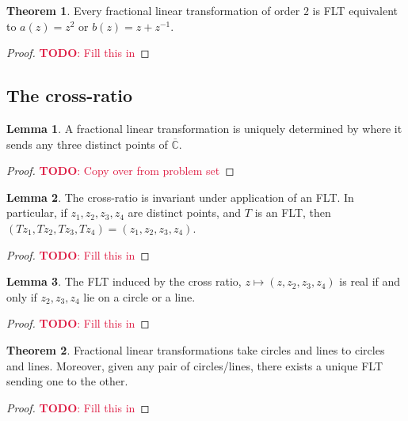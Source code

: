 \documentclass[aps,pra,showpacs,notitlepage,onecolumn,superscriptaddress,nofootinbib]{revtex4-1}
\newcommand{\pop}[1]{\textcolor{crimson}{#1}}
\theoremstyle{definition}
\newtheorem{lemma}{Lemma}[section]
\newtheorem{theorem}{Theorem}[section]
\begin{document}
\begin{theorem}
  Every fractional linear transformation of order $2$ is FLT equivalent to $a(z) = z^2$ or $b(z) = z + z^{-1}$.
\end{theorem}

\begin{proof}
  \pop{\textbf{TODO}: Fill this in}
  \end{proof}

\subsection{The cross-ratio}

\begin{lemma}
  A fractional linear transformation is uniquely determined by where it sends any three distinct points of $\overline{\mathbb{C}}$.
\end{lemma}
\begin{proof}
  \pop{\textbf{TODO}: Copy over from problem set}
\end{proof}

\begin{lemma}
  The cross-ratio is invariant under application of an FLT. In particular, if $z_1, z_2, z_3, z_4$ are distinct points, and $T$ is an FLT, then $(Tz_1, Tz_2, Tz_3, Tz_4) = (z_1, z_2, z_3, z_4)$.
\end{lemma}

\begin{proof}
  \pop{\textbf{TODO}: Fill this in}
\end{proof}

\begin{lemma}
  The FLT induced by the cross ratio, $z \mapsto (z, z_2, z_3, z_4)$ is real if and only if $z_2, z_3, z_4$ lie on a circle or a line.
\end{lemma}

\begin{proof}
  \pop{\textbf{TODO}: Fill this in}
\end{proof}

\begin{theorem}
  Fractional linear transformations take circles and lines to circles and lines. Moreover, given any pair of circles/lines, there exists a unique FLT sending one
  to the other.
\end{theorem}

\begin{proof}
  \pop{\textbf{TODO}: Fill this in}
\end{proof}
\end{document}
